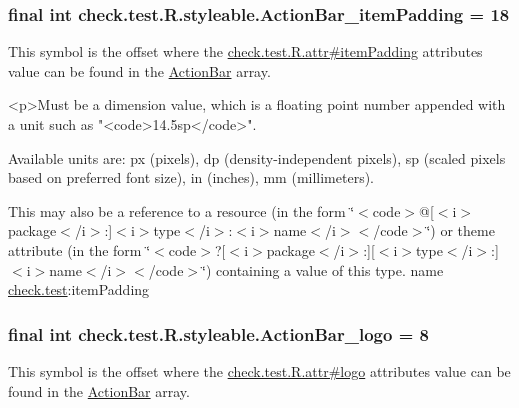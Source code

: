 \subsubsection[{Action\+Bar\+\_\+item\+Padding}]{\setlength{\rightskip}{0pt plus 5cm}final int check.\+test.\+R.\+styleable.\+Action\+Bar\+\_\+item\+Padding = 18\hspace{0.3cm}{\ttfamily [static]}}\label{classcheck_1_1test_1_1_r_1_1styleable_a1e919ff125d9a130e6515a258bc0ebbd}
This symbol is the offset where the \hyperlink{classcheck_1_1test_1_1_r_1_1attr_ab2727a6858d6de3d85c2cb2ca13fde08}{check.\+test.\+R.\+attr\#item\+Padding} attribute\textquotesingle{}s value can be found in the \hyperlink{classcheck_1_1test_1_1_r_1_1styleable_ad0a4d403cb244ea4d22c6f6ebf2c2cdf}{Action\+Bar} array.

\begin{DoxyVerb}      <p>Must be a dimension value, which is a floating point number appended with a unit such as "<code>14.5sp</code>".
\end{DoxyVerb}
 Available units are\+: px (pixels), dp (density-\/independent pixels), sp (scaled pixels based on preferred font size), in (inches), mm (millimeters). 

This may also be a reference to a resource (in the form \char`\"{}$<$code$>$@\mbox{[}$<$i$>$package$<$/i$>$\+:\mbox{]}$<$i$>$type$<$/i$>$\+:$<$i$>$name$<$/i$>$$<$/code$>$\char`\"{}) or theme attribute (in the form \char`\"{}$<$code$>$?\mbox{[}$<$i$>$package$<$/i$>$\+:\mbox{]}\mbox{[}$<$i$>$type$<$/i$>$\+:\mbox{]}$<$i$>$name$<$/i$>$$<$/code$>$\char`\"{}) containing a value of this type.  name \hyperlink{namespacecheck_1_1test}{check.\+test}\+:item\+Padding \hypertarget{classcheck_1_1test_1_1_r_1_1styleable_ac94a2b6df672cef0c246aff7b6bfaa23}{}
\subsubsection[{Action\+Bar\+\_\+logo}]{\setlength{\rightskip}{0pt plus 5cm}final int check.\+test.\+R.\+styleable.\+Action\+Bar\+\_\+logo = 8\hspace{0.3cm}{\ttfamily [static]}}\label{classcheck_1_1test_1_1_r_1_1styleable_ac94a2b6df672cef0c246aff7b6bfaa23}
This symbol is the offset where the \hyperlink{classcheck_1_1test_1_1_r_1_1attr_a88dc33a575e7d1ce7a25603825bb87c0}{check.\+test.\+R.\+attr\#logo} attribute\textquotesingle{}s value can be found in the \hyperlink{classcheck_1_1test_1_1_r_1_1styleable_ad0a4d403cb244ea4d22c6f6ebf2c2cdf}{Action\+Bar} array.

